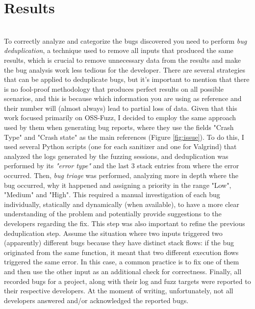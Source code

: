 \chapter{Results} \label{chap_4}
\ \\
To correctly analyze and categorize the bugs discovered you need to perform \textit{bug deduplication}, a technique used to remove all inputs that produced the same results, which is crucial to remove unnecessary data from the results and make the bug analysis work less tedious for the developer.
\newline
There are several strategies that can be applied to deduplicate bugs, but it's important to mention that there is no fool-proof methodology that produces perfect results on all possible scenarios, and this is because which information you are using as reference and their number will (almost always) lead to partial loss of data.
\newline
Given that this work focused primarily on OSS-Fuzz, I decided to employ the same approach used by them when generating bug reports, where they use the fields "Crash Type" and "Crash state" as the main references (Figure \ref{fig:issue}).
\newline
To do this, I used several Python scripts (one for each sanitizer and one for Valgrind) that analyzed the logs generated by the fuzzing sessions, and deduplication was performed by its \textit{"error type"} and the last 3 stack entries from where the error occurred.
\newline \newline
Then, \textit{bug triage} was performed, analyzing more in depth where the bug occurred, why it happened and assigning a priority in the range "Low", "Medium" and "High". This required a manual investigation of each bug individually, statically and dynamically (when available), to have a more clear understanding of the problem and potentially provide suggestions to the developers regarding the fix.
\newline
This step was also important to refine the previous deduplication step.
\newline
Assume the situation where two inputs triggered two (apparently) different bugs because they have distinct stack flows: if the bug originated from the same function, it meant that two different execution flows triggered the same error. In this case, a common practice is to fix one of them and then use the other input as an additional check for correctness.
\newline \newline
Finally, all recorded bugs for a project, along with their log and fuzz targets were reported to their respective developers.
\newline
At the moment of writing, unfortunately, not all developers answered and/or acknowledged the reported bugs.






